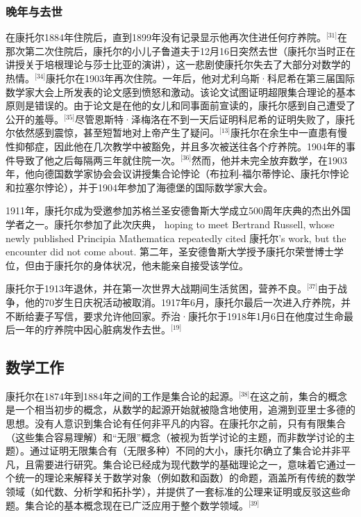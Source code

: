 \subsubsection{晚年与去世}  
在康托尔1884年住院后，直到1899年没有记录显示他再次住进任何疗养院。\(^\text{[31]}\)在那次第二次住院后，康托尔的小儿子鲁道夫于12月16日突然去世（康托尔当时正在讲授关于培根理论与莎士比亚的演讲），这一悲剧使康托尔失去了大部分对数学的热情。\(^\text{[34]}\)康托尔在1903年再次住院。一年后，他对尤利乌斯·科尼希在第三届国际数学家大会上所发表的论文感到愤怒和激动。该论文试图证明超限集合理论的基本原则是错误的。由于论文是在他的女儿和同事面前宣读的，康托尔感到自己遭受了公开的羞辱。\(^\text{[35]}\)尽管恩斯特·泽梅洛在不到一天后证明科尼希的证明失败了，康托尔依然感到震惊，甚至短暂地对上帝产生了疑问。\(^\text{[13]}\)康托尔在余生中一直患有慢性抑郁症，因此他在几次教学中被豁免，并且多次被送往各个疗养院。1904年的事件导致了他之后每隔两三年就住院一次。\(^\text{[36]}\)然而，他并未完全放弃数学，在1903年，他向德国数学家协会会议讲授集合论悖论（布拉利-福尔蒂悖论、康托尔悖论和拉塞尔悖论），并于1904年参加了海德堡的国际数学家大会。

1911年，康托尔成为受邀参加苏格兰圣安德鲁斯大学成立500周年庆典的杰出外国学者之一。康托尔参加了此次庆典， hoping to meet Bertrand Russell, whose newly published Principia Mathematica repeatedly cited 康托尔's work, but the encounter did not come about. 第二年，圣安德鲁斯大学授予康托尔荣誉博士学位，但由于康托尔的身体状况，他未能亲自接受该学位。

康托尔于1913年退休，并在第一次世界大战期间生活贫困，营养不良。\(^\text{[37]}\)由于战争，他的70岁生日庆祝活动被取消。1917年6月，康托尔最后一次进入疗养院，并不断给妻子写信，要求允许他回家。乔治·康托尔于1918年1月6日在他度过生命最后一年的疗养院中因心脏病发作去世。\(^\text{[19]}\)
\subsection{数学工作}  
康托尔在1874年到1884年之间的工作是集合论的起源。\(^\text{[38]}\)在这之前，集合的概念是一个相当初步的概念，从数学的起源开始就被隐含地使用，追溯到亚里士多德的思想。没有人意识到集合论有任何非平凡的内容。在康托尔之前，只有有限集合（这些集合容易理解）和“无限”概念（被视为哲学讨论的主题，而非数学讨论的主题）。通过证明无限集合有（无限多种）不同的大小，康托尔确立了集合论并非平凡，且需要进行研究。集合论已经成为现代数学的基础理论之一，意味着它通过一个统一的理论来解释关于数学对象（例如数和函数）的命题，涵盖所有传统的数学领域（如代数、分析学和拓扑学），并提供了一套标准的公理来证明或反驳这些命题。集合论的基本概念现在已广泛应用于整个数学领域。\(^\text{[39]}\)

